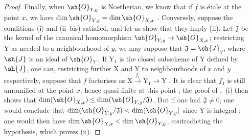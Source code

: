\begin{proof}
Finally, when $\sh{O}_{Y,y}$ is Noetherian, we know that if $f$ is \'etale at the point $x$, we have $\dim\sh{O}_{Y,y}=\dim\sh{O}_{X,x}$ .
Conversely, suppose the conditions (i) and (ii~bis) satisfied, and let us show that they imply (ii).
Let $\mathfrak{J}$ be the kernel of the canonical homomorphism $\sh{O}_{Y,y}\to\sh{O}_{X,x}$; restricting Y as needed to a neighbourhood of $y$, we may suppose that $\mathfrak{J}=\sh{J}_y$, where $\sh{J}$ is an ideal of $\sh{O}_Y$.
If $\mathrm{Y}_1$ is the closed subscheme of $\mathrm{Y}$ defined by $\sh{J}$, one can, restricting further $\mathrm{X}$ and $\mathrm{Y}$ to neighbourhoods of $x$ and $y$ respectively, suppose that $f$ factorises as $\mathrm{X}\xrightarrow{f_1}\mathrm{Y}_1\to\mathrm{Y}$ .
It is clear that $f_1$ is still unramified at the point $x$, hence quasi-finite at this point ; the proof of ,~(i) then shows that $\dim(\sh{O}_{X,x})\leq\dim(\sh{O}_{Y,y}/\mathfrak{J})$.
But if one had $\mathfrak{J}\neq 0$, one would conclude that $\dim(\sh{O}_{Y,y}/\mathfrak{J})<\dim(\sh{O}_{Y,y})$ since $\mathrm{Y}$ is integral ; one would then have $\dim\sh{O}_{X,x}<\dim\sh{O}_{Y,y}$, contradicting the hypothesis, which proves (ii).
\end{proof}

